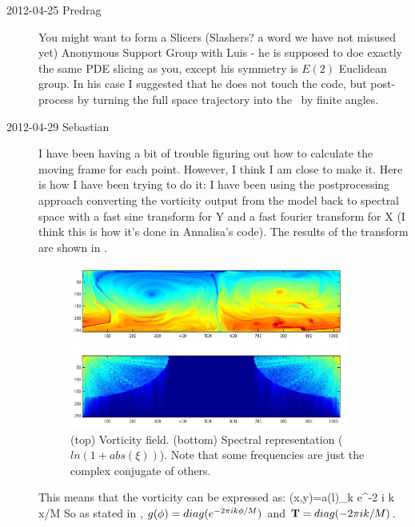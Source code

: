 \begin{description}
\item[2012-04-25 Predrag] You might want to form a Slicers (Slashers? a
word we have not misused yet) Anonymous Support Group with Luis - he is
supposed to doe exactly the same PDE slicing as you, except his symmetry
is $E(2)$ Euclidean group. In his case I suggested that he does not touch
the code, but post-process by turning the full space trajectory into the
\slice\ by finite angles.

\item[2012-04-29 Sebastian]
I have been having a bit of trouble figuring out how to calculate the
moving frame for each point. However, I think I am close to make it.
Here is how I have been trying to do it: I have been using the
postprocessing approach converting the vorticity output from the model
back to spectral space with a fast sine transform for Y and a fast
fourier transform for X (I think this is how it's done in Annalisa's
code). The results of the transform are shown in .

    \begin{figure}[t]
    \begin{center}
    \includegraphics[width=0.9\textwidth, clip=true]{fouriervort}
    \end{center}
    \caption{(top) Vorticity field. (bottom) Spectral representation
    ($ln(1+abs(\xi))$). Note that some frequencies are just the complex
    conjugate of others.}
    \label{f:fouriervort}
    \end{figure}

This means that the vorticity can be expressed as:
    \beq
    \xi(x,y)=\sum a(l)_{k} e^{-2 i \pi k x/M}
So as stated in , $g({\bf \phi})=diag(e^{-2 \pi i k {\bf \phi} /M})$
and $\mathbf{T}=diag(-2 \pi i k/M)$.


\end{description}
